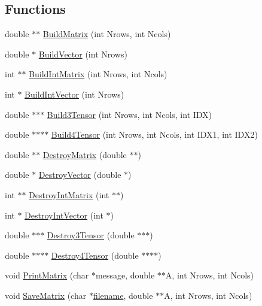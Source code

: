 \subsection*{Functions}
\begin{DoxyCompactItemize}
\item 
double $\ast$$\ast$ \hyperlink{a00554_a4bf6e503687187059ced10b812beaab3}{Build\+Matrix} (int Nrows, int Ncols)
\item 
double $\ast$ \hyperlink{a00554_a990278305dbeaf8e4441cf4146bfdc62}{Build\+Vector} (int Nrows)
\item 
int $\ast$$\ast$ \hyperlink{a00554_a77f751d54b396015520a882d7a318e57}{Build\+Int\+Matrix} (int Nrows, int Ncols)
\item 
int $\ast$ \hyperlink{a00554_a0f24d8056fa979af4888469ea90576ff}{Build\+Int\+Vector} (int Nrows)
\item 
double $\ast$$\ast$$\ast$ \hyperlink{a00554_a6031ee45d6b3d95665a885b7128c311c}{Build3\+Tensor} (int Nrows, int Ncols, int I\+DX)
\item 
double $\ast$$\ast$$\ast$$\ast$ \hyperlink{a00554_a745a480f3faf250c87406ddb1d8d0e4f}{Build4\+Tensor} (int Nrows, int Ncols, int I\+D\+X1, int I\+D\+X2)
\item 
double $\ast$$\ast$ \hyperlink{a00554_afa534e284e3bdd83ec70e03b3348d960}{Destroy\+Matrix} (double $\ast$$\ast$)
\item 
double $\ast$ \hyperlink{a00554_a6d2c56d5886407db34f7810cd4ebb1ac}{Destroy\+Vector} (double $\ast$)
\item 
int $\ast$$\ast$ \hyperlink{a00554_a4212ac496c2e42e38dd0ad0cd18ed161}{Destroy\+Int\+Matrix} (int $\ast$$\ast$)
\item 
int $\ast$ \hyperlink{a00554_ab7be757b254a2ca937d1d5399cbc63af}{Destroy\+Int\+Vector} (int $\ast$)
\item 
double $\ast$$\ast$$\ast$ \hyperlink{a00554_a51bb9f1cde4263ba91387d1c20dcf8c7}{Destroy3\+Tensor} (double $\ast$$\ast$$\ast$)
\item 
double $\ast$$\ast$$\ast$$\ast$ \hyperlink{a00554_a04367038e0614f8f3a881b057048d009}{Destroy4\+Tensor} (double $\ast$$\ast$$\ast$$\ast$)
\item 
void \hyperlink{a00554_a75942b12ae1b0172595c4d482b8203c0}{Print\+Matrix} (char $\ast$message, double $\ast$$\ast$A, int Nrows, int Ncols)
\item 
void \hyperlink{a00554_ac376677d3caaa98a9daf61674a973d1b}{Save\+Matrix} (char $\ast$\hyperlink{a00623_a42a21beb8018ac623f4d09db1343b9cf}{filename}, double $\ast$$\ast$A, int Nrows, int Ncols)
$$
\end{DoxyCompactItemize}
